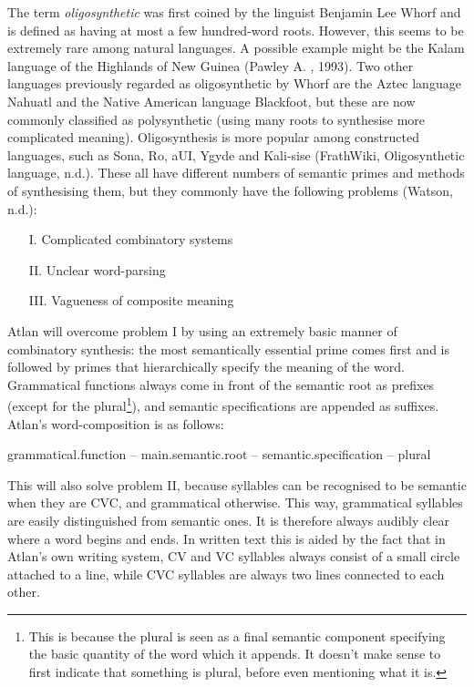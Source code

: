 The term \textit{oligosynthetic} was first coined by the linguist Benjamin Lee Whorf and is defined as having at most a few hundred-word roots. However, this seems to be extremely rare among natural languages. A possible example might be the Kalam language of the Highlands of New Guinea (Pawley A. , 1993). Two other languages previously regarded as oligosynthetic by Whorf are the Aztec language Nahuatl and the Native American language Blackfoot, but these are now commonly classified as polysynthetic (using many roots to synthesise more complicated meaning). Oligosynthesis is more popular among constructed languages, such as Sona, Ro, aUI, Ygyde and Kali-sise (FrathWiki, Oligosynthetic language, n.d.). These all have different numbers of semantic primes and methods of synthesising them, but they commonly have the following problems (Watson, n.d.): 

\begin{itemize}
\item [I.] Complicated combinatory systems  

\item[II.] Unclear word-parsing  

\item[III.]Vagueness of composite meaning 
\end{itemize}

Atlan will overcome problem {\selectfont I} by using an extremely basic manner of combinatory synthesis: the most semantically essential prime comes first and is followed by primes that hierarchically specify the meaning of the word. Grammatical functions always come in front of the semantic root as prefixes (except for the plural\footnote{This is because the plural is seen as a final semantic component specifying the basic quantity of the word which it appends. It doesn’t make sense to first indicate that something is plural, before even mentioning what it is. }), and semantic specifications are appended as suffixes. Atlan's word-composition is as follows:  

\begin{center}
{grammatical.function –  main.semantic.root – semantic.specification – plural} 
\end{center}
\quad
 

This will also solve problem II, because syllables can be recognised to be semantic when they are CVC, and grammatical otherwise. This way, grammatical syllables are easily distinguished from semantic ones. It is therefore always audibly clear where a word begins and ends. In written text this is aided by the fact that in Atlan’s own writing system, CV and VC syllables always consist of a small circle attached to a line, while CVC syllables are always two lines connected to each other.  

